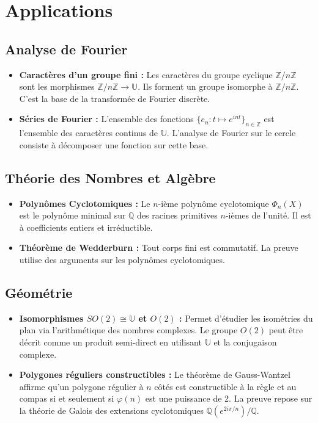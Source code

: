 \documentclass[12pt, a4paper, parskip=full]{report}
\theoremstyle{agregstyle}
\begin{document}
\section{Applications}

\subsection{Analyse de Fourier}
\begin{itemize}
    \item \textbf{Caractères d'un groupe fini :} Les caractères du groupe cyclique $\mathbb{Z}/n\mathbb{Z}$ sont les morphismes $\mathbb{Z}/n\mathbb{Z} \to \mathbb{U}$. Ils forment un groupe isomorphe à $\mathbb{Z}/n\mathbb{Z}$. C'est la base de la transformée de Fourier discrète.
    \item \textbf{Séries de Fourier :} L'ensemble des fonctions $\{e_n : t \mapsto e^{int}\}_{n \in \mathbb{Z}}$ est l'ensemble des caractères continus de $\mathbb{U}$. L'analyse de Fourier sur le cercle consiste à décomposer une fonction sur cette base.
\end{itemize}

\subsection{Théorie des Nombres et Algèbre}
\begin{itemize}
    \item \textbf{Polynômes Cyclotomiques :} Le $n$-ième polynôme cyclotomique $\Phi_n(X)$ est le polynôme minimal sur $\mathbb{Q}$ des racines primitives $n$-ièmes de l'unité. Il est à coefficients entiers et irréductible.
    \item \textbf{Théorème de Wedderburn :} Tout corps fini est commutatif. La preuve utilise des arguments sur les polynômes cyclotomiques.
\end{itemize}

\subsection{Géométrie}
\begin{itemize}
    \item \textbf{Isomorphismes $SO(2) \cong \mathbb{U}$ et $O(2)$ :} Permet d'étudier les isométries du plan via l'arithmétique des nombres complexes. Le groupe $O(2)$ peut être décrit comme un produit semi-direct en utilisant $\mathbb{U}$ et la conjugaison complexe.
    \item \textbf{Polygones réguliers constructibles :} Le théorème de Gauss-Wantzel affirme qu'un polygone régulier à $n$ côtés est constructible à la règle et au compas si et seulement si $\varphi(n)$ est une puissance de 2. La preuve repose sur la théorie de Galois des extensions cyclotomiques $\mathbb{Q}(e^{2i\pi/n})/\mathbb{Q}$.
\end{itemize}
\end{document}
